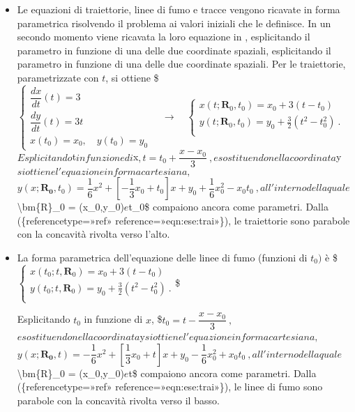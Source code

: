 \documentclass[letterpaper,10pt,italian]{jupyterBook}
\begin{document}
\begin{itemize}
\item {} 
\sphinxAtStartPar
{} Le equazioni di traiettorie, linee di fumo e tracce
vengono ricavate in forma parametrica risolvendo il problema ai
valori iniziali che le definisce. In un secondo momento viene
ricavata la loro equazione in , esplicitando il
parametro in funzione di una delle due coordinate spaziali,
esplicitando il parametro in funzione di una delle due coordinate
spaziali. Per le traiettorie, parametrizzate con \(t\), si ottiene
\$\(\label{eqn:ese:par}
 \begin{cases}
  \dfrac{dx}{dt}(t) = 3 \\
  \dfrac{dy}{dt}(t) = 3t \\
  x(t_0) = x_0 , \quad y(t_0) = y_0
 \end{cases}
 \quad \rightarrow \quad
 \begin{cases}
  x(t;\bm{R}_0,t_0) = x_0 + 3(t-t_0) \\
  y(t;\bm{R}_0,t_0) = y_0 +\frac{3}{2} (t^2 -t_0^2) \ . \\
 \end{cases}\)\( Esplicitando \)t\( in funzione di \)x\(,
\)\(t = t_0 + \dfrac{x-x_0}{3} \ ,\)\( e sostituendo nella coordinata
\)y\( si ottiene l'equazione in forma cartesiana,
\)\(\label{eqn:ese:trai}
 y(x;\bm{R_0},t_0) = \dfrac{1}{6}x^2 + \left[ -\dfrac{1}{3}x_0 +t_0 \right] x +
 y_0 + \dfrac{1}{6}x_0^2 - x_0 t_0 \ ,\)\( all'interno della quale
\)\textbackslash{}bm\{R\}\_0 = (x\_0,y\_0)\( e \)t\_0\$ compaiono ancora come parametri.
Dalla (\{reference\sphinxhyphen{}type=»ref»
reference=»eqn:ese:trai»\}), le traiettorie sono parabole con la
concavità rivolta verso l’alto.

\item {} 
\sphinxAtStartPar
{} La forma parametrica
dell’equazione delle linee di fumo (funzioni di \(t_0)\) è
\$\(\begin{cases}
  x(t_0;t,\bm{R}_0) = x_0 + 3(t-t_0) \\
  y(t_0;t,\bm{R}_0) = y_0 +\frac{3}{2} (t^2 -t_0^2) \ . \\
 \end{cases}\)\$

\sphinxAtStartPar
Esplicitando \(t_0\) in funzione di \(x\),
\$\(t_0 = t - \dfrac{x-x_0}{3} \ ,\)\( e sostituendo nella coordinata
\)y\( si ottiene l'equazione in forma cartesiana,
\)\(\label{eqn:ese:trai}
 y(x;\bm{R_0},t) = -\dfrac{1}{6}x^2 + \left[ \dfrac{1}{3}x_0 +t \right] x +
 y_0 - \dfrac{1}{6}x_0^2 + x_0 t_0 \ ,\)\( all'interno della quale
\)\textbackslash{}bm\{R\}\_0 = (x\_0,y\_0)\( e \)t\$ compaiono ancora come parametri. Dalla
(\{reference\sphinxhyphen{}type=»ref»
reference=»eqn:ese:trai»\}), le linee di fumo sono parabole con la
concavità rivolta verso il basso.


\end{itemize}
\end{document}
